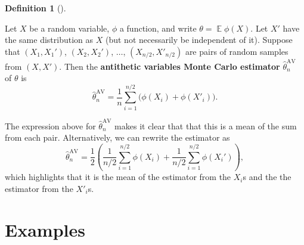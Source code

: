 \documentclass[
  letterpaper,
  DIV=11,
  numbers=noendperiod]{scrreprt}
\newcommand{\Exg}{\operatorname{\mathbb{E}}}
\theoremstyle{plain}
\theoremstyle{definition}
\newtheorem{definition}{Definition}[chapter]
\theoremstyle{definition}
\theoremstyle{remark}
\begin{document}
\begin{definition}[]\protect\hypertarget{def-AV}{}\label{def-AV}

Let \(X\) be a random variable, \(\phi\) a function, and write
\(\theta = \Exg\phi(X)\). Let \(X'\) have the same distribution as \(X\)
(but not necessarily be independent of it). Suppose that
\((X_1, X_1')\), \((X_2, X_2')\), \(\dots\), \((X_{n/2}, X'_{n/2})\) are
pairs of random samples from \((X, X')\). Then the \textbf{antithetic
variables Monte Carlo estimator} \(\widehat\theta_n^{\mathrm{AV}}\) of
\(\theta\) is
\[ \widehat{\theta}_n^{\mathrm{AV}} = \frac{1}{n} \sum_{i=1}^{n/2} \big(\phi(X_i) + \phi(X'_i) \big) .\]

\end{definition}

The expression above for \(\widehat{\theta}_n^{\mathrm{AV}}\) makes it
clear that that this is a mean of the sum from each pair. Alternatively,
we can rewrite the estimator as
\[ \widehat{\theta}_n^{\mathrm{AV}} = \frac{1}{2} \left( \frac{1}{n/2} \sum_{i=1}^{n/2} \phi(X_i) + \frac{1}{n/2} \sum_{i=1}^{n/2} \phi(X_i') \right) , \]
which highlights that it is the mean of the estimator from the \(X_i\)s
and the the estimator from the \(X'_i\)s.

\section{Examples}\label{examples-1}
\end{document}
